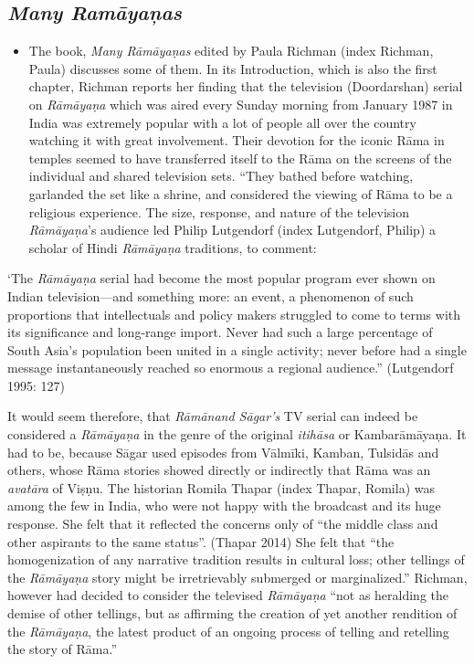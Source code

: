 \subsection*{\textit{Many Ramāyaņas}}

\begin{itemize}
\item The book, \textit{Many Rāmāyaṇas} edited by Paula Richman (index Richman, Paula) discusses some of them. In its Introduction, which is also the first chapter, Richman reports her finding that the television (Doordarshan) serial on \textit{Rāmāyaṇa} which was aired every Sunday morning from January 1987 in India was extremely popular with a lot of people all over the country watching it with great involvement. Their devotion for the iconic Rāma in temples seemed to have transferred itself to the Rāma on the screens of the individual and shared television sets. “They bathed before watching, garlanded the set like a shrine, and considered the viewing of Rāma to be a religious experience. The size, response, and nature of the television \textit{Rāmāyaṇa}'s audience led Philip Lutgendorf (index Lutgendorf, Philip) a scholar of Hindi \textit{Rāmāyaṇa} traditions, to comment:

\end{itemize}

\begin{myquote}
‘The \textit{Rāmāyaṇa} serial had become the most popular program ever shown on Indian television—and something more: an event, a phenomenon of such proportions that intellectuals and policy makers struggled to come to terms with its significance and long-range import. Never had such a large percentage of South Asia's population been united in a single activity; never before had a single message instantaneously reached so enormous a regional audience.” (Lutgendorf 1995: 127)
\end{myquote}

It would seem therefore, that \textit{Rāmānand Sāgar’s} TV serial can indeed be considered a \textit{Rāmāyaṇa} in the genre of the original \textit{itihāsa} or Kambarāmāyaņa. It had to be, because Sāgar used episodes from Vālmīki, Kamban, Tulsidās and others, whose Rāma stories showed directly or indirectly that Rāma was an \textit{avatāra} of Viṣṇu. The historian Romila Thapar (index Thapar, Romila) was among the few in India, who were not happy with the broadcast and its huge response. She felt that it reflected the concerns only of “the middle class and other aspirants to the same status”. (Thapar 2014) She felt that “the homogenization of any narrative tradition results in cultural loss; other tellings of the \textit{Rāmāyaṇa} story might be irretrievably submerged or marginalized.” Richman, however had decided to consider the televised \textit{Rāmāyaṇa} “not as heralding the demise of other tellings, but as affirming the creation of yet another rendition of the \textit{Rāmāyaṇa}, the latest product of an ongoing process of telling and retelling the story of Rāma.”

